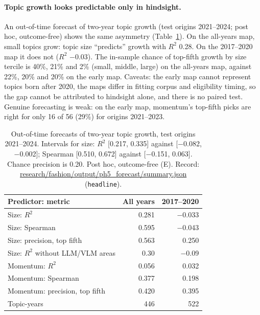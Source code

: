 \paragraph{Topic growth looks predictable only in hindsight.} An out-of-time forecast of two-year topic growth (test
origins 2021--2024; post hoc, outcome-free) shows the same asymmetry (Table~\ref{tab:app-forecast}). On the all-years
map, small topics grow: topic size ``predicts'' growth with $R^2$ 0.28. On the 2017--2020 map it does not ($R^2$
$-$0.03). The in-sample chance of top-fifth growth by size tercile is 40\%, 21\% and 2\% (small, middle, large) on
the all-years map, against 22\%, 20\% and 20\% on the early map. Caveats: the early map cannot represent topics born
after 2020, the maps differ in fitting corpus and eligibility timing, so the gap cannot be attributed to hindsight
alone, and there is no paired test. Genuine forecasting is weak: on the early map, momentum's top-fifth picks are right for
only 16 of 56 (29\%) for origins 2021--2023.

\begin{table}[t]
\centering\footnotesize
\setlength{\tabcolsep}{3.5pt}
\begin{tabular}{@{}lrr@{}}
\toprule
Predictor: metric & All years & 2017--2020 \\
\midrule
Size: $R^2$ & 0.281 & $-$0.033 \\
Size: Spearman & 0.595 & $-$0.043 \\
Size: precision, top fifth & 0.563 & 0.250 \\
Size: $R^2$ without LLM/VLM areas & 0.30 & $-$0.09 \\
Momentum: $R^2$ & 0.056 & 0.032 \\
Momentum: Spearman & 0.377 & 0.198 \\
Momentum: precision, top fifth & 0.420 & 0.395 \\
Topic-years & 446 & 522 \\
\bottomrule
\end{tabular}
\caption{Out-of-time forecasts of two-year topic growth, test origins 2021--2024. Intervals for size: $R^2$ [0.217,
0.335] against [$-$0.082, $-$0.002]; Spearman [0.510, 0.672] against [$-$0.151, 0.063]. Chance precision is 0.20.
Post hoc, outcome-free (E). Record: \url{research/fashion/output/ph5_forecast/summary.json}
(\texttt{headline}).}
\label{tab:app-forecast}
\end{table}

